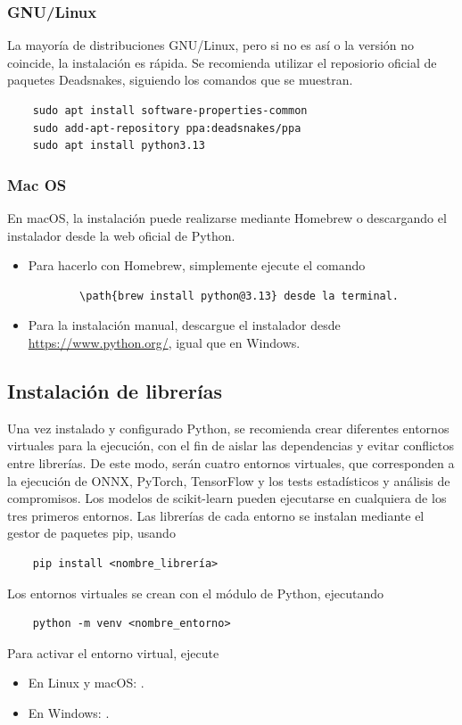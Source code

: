 \documentclass[a4paper,12pt,twoside,final]{book}
\begin{document}
\subsubsection{GNU/Linux}
La mayoría de distribuciones GNU/Linux, pero si no es así o la versión no coincide, la instalación es rápida. Se
recomienda utilizar el reposiorio oficial de paquetes Deadsnakes, siguiendo los comandos que se muestran.
\begin{verbatim}
    sudo apt install software-properties-common
    sudo add-apt-repository ppa:deadsnakes/ppa
    sudo apt install python3.13
\end{verbatim}

\subsubsection{Mac OS}
En macOS, la instalación puede realizarse mediante Homebrew o descargando el instalador desde la web oficial de Python.
\begin{itemize}
    \item Para hacerlo con Homebrew, simplemente ejecute el comando
    \begin{verbatim}
        \path{brew install python@3.13} desde la terminal.
    \end{verbatim}
    \item Para la instalación manual, descargue el instalador desde \url{https://www.python.org/}, igual que en Windows.
\end{itemize}

\subsection{Instalación de librerías}
Una vez instalado y configurado Python, se recomienda crear diferentes entornos virtuales para la ejecución, con el fin
de aislar las dependencias y evitar conflictos entre librerías. De este modo, serán cuatro entornos virtuales, que
corresponden a la ejecución de ONNX, PyTorch, TensorFlow y los tests estadísticos y análisis de compromisos. Los modelos
de scikit-learn pueden ejecutarse en cualquiera de los tres primeros entornos. Las librerías de cada entorno se
instalan mediante el gestor de paquetes pip, usando
\begin{verbatim}
    pip install <nombre_librería>
\end{verbatim}
Los entornos virtuales se crean con el módulo  de Python, ejecutando
\begin{verbatim}
    python -m venv <nombre_entorno>
\end{verbatim}
Para activar el entorno virtual, ejecute
\begin{itemize}
    \item En Linux y macOS: .
    \item En Windows: .
\end{itemize}
\end{document}

